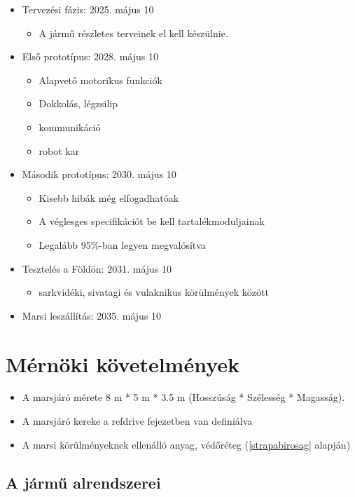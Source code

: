 \documentclass[12pt]{report}
\begin{document}
\begin{itemize}
  \item Tervezési fázis: 2025. május 10
  \begin{itemize}
    \item A jármű részletes terveinek el kell készülnie.
  \end{itemize}
  \item Első prototípus: 2028. május 10
  \begin{itemize}
    \item Alapvető motorikus funkciók
    \item Dokkolás, légzsilip
    \item kommunikáció
    \item robot kar
  \end{itemize}
  \item Második prototípus: 2030. május 10
  \begin{itemize}
    \item Kisebb hibák még elfogadhatóak
    \item A véglesges specifikációt be kell tartalékmoduljainak
    \item Legalább 95\%-ban legyen megvalósítva
  \end{itemize}
  \item Tesztelés a Földön: 2031. május 10
  \begin{itemize}
    \item sarkvidéki, sivatagi és vulaknikus körülmények között
  \end{itemize}
  \item Marsi leszállítás: 2035. május 10
\end{itemize}


\section{Mérnöki követelmények}
\begin{itemize}
  \item A marsjáró mérete 8 m * 5 m * 3.5 m (Hosszúság * Szélesség * Magasság).
  \item A marsjáró kereke a ref{drive} fejezetben van definiálva \
  \item A marsi körülményeknek ellenálló anyag, védőréteg (\ref{strapabirosag} alapján)
\end{itemize}

\subsection{A jármű alrendszerei}\label{subsystems}
\end{document}
